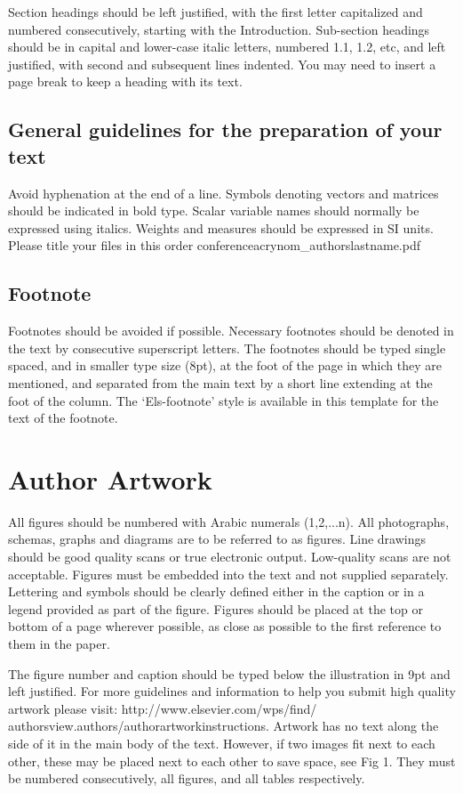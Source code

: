 \documentclass[3p,times,procedia]{elsarticle}
\begin{document}
Section headings should be left justified, with the first letter capitalized and numbered consecutively, starting with the Introduction. Sub-section headings should be in capital and lower-case italic letters, numbered 1.1, 1.2, etc, and left justified, with second and subsequent lines indented.  You may need to insert a page break to keep a heading with its text.


\subsection{General guidelines for the preparation of your text}
Avoid hyphenation at the end of a line. Symbols denoting vectors and matrices should be indicated in bold type. Scalar variable names should normally be expressed using italics. Weights and measures should be expressed in SI units. Please title your files in this order conferenceacrynom\_authorslastname.pdf


\subsection{Footnote}
Footnotes should be avoided if possible. Necessary footnotes should be denoted in the text by consecutive superscript letters. The footnotes should be typed single spaced, and in smaller type size (8pt), at the foot of the page in which they are mentioned, and separated from the main text by a short line extending at the foot of the column.  The ‘Els-footnote’ style is available in this template for the text of the footnote.

\section{ Author Artwork}
All figures should be numbered with Arabic numerals (1,2,...n). All photographs, schemas, graphs and diagrams are to be referred to as figures. Line drawings should be good quality scans or true electronic output. Low-quality scans are not acceptable. Figures must be embedded into the text and not supplied separately. Lettering and symbols should be clearly defined either in the caption or in a legend provided as part of the figure. Figures should be placed at the top or bottom of a page wherever possible, as close as possible to the first reference to them in the paper.

The figure number and caption should be typed below the illustration in 9pt and left justified. For more guidelines and information to help you submit high quality artwork please visit: http://www.elsevier.com/wps/find/ authorsview.authors/authorartworkinstructions. Artwork has no text along the side of it in the main body of the text.  However, if two images fit next to each other, these may be placed next to each other to save space, see Fig 1. They must be numbered consecutively, all figures, and all tables respectively.
\end{document}
